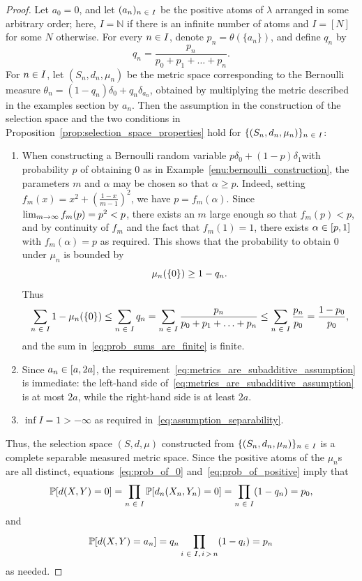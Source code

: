 \documentclass[AHL,Unicode]{cedram}
\newcommand*\n{\mathbb{N}}
\newcommand*\p{\mathbb{P}}
\let\originalleft\left
\let\originalright\right
\renewcommand{\left}{\mathopen{}\mathclose\bgroup\originalleft}
\renewcommand{\right}{\aftergroup\egroup\originalright}
\renewcommand*{\to}{\mathchoice{\longrightarrow}{\rightarrow}{\rightarrow}{\rightarrow}}
\let\oldin\in
\renewcommand{\in}{\mathchoice{\oldin}{\oldin}{\,\oldin\,}{\,\oldin\,}}
\begin{document}
\begin{proof}
Let $a_{0}=0$, and let $(a_{n})_{n\in I}$ be the positive atoms of $\lambda$ arranged in some arbitrary order; here, $I=\n$ if there is an infinite number of atoms and $I=[N]$ for some $N$ otherwise. For every $n\in I$, denote $p_{n}=\theta(\{ a_{n}\})$, and define $q_{n}$ by
\[
q_{n}=\frac{p_{n}}{p_{0}+p_{1}+\ldots+p_{n}}.
\]
For $n\in I$, let $(S_{n},d_{n},\mu_{n})$ be the metric space corresponding to the Bernoulli measure $\theta_{n}=(1-q_{n})\delta_{0}+q_{n}\delta_{a_{n}}$, obtained by multiplying the metric described in the examples section by $a_{n}$. Then the assumption in the construction of the selection space and the two conditions in Proposition~\ref{prop:selection_space_properties} hold for $\{ (S_{n},d_{n},\mu_{n})\} _{n\in I}$:
\begin{enumerate}
\item When constructing a Bernoulli random variable $p\delta_{0}+(1-p)\delta_{1}$with probability $p$ of obtaining $0$ as in Example~\ref{enu:bernoulli_construction}, the parameters $m$ and $\alpha$ may be chosen so that $\alpha\geq p$. Indeed, setting $f_{m}(x)=x^{2}+(\frac{1-x}{m-1})^{2}$, we have $p=f_{m}(\alpha)$. Since $\lim_{m\to\infty}f_{m}(p)=p^{2}<p$, there exists an $m$ large enough so that $f_{m}(p)<p$, and by continuity of $f_{m}$ and the fact that $f_{m}(1)=1$, there exists $\alpha\in[p,1]$ with $f_{m}(\alpha)=p$ as required. This shows that the probability to obtain $0$ under $\mu_{n}$ is bounded by
\begin{equation}\label{eq:bound_on_q}
\mu_{n}\left(\left\{ 0\right\} \right)\geq1-q_{n}.
\end{equation}
Thus
\begin{equation}\label{eq:sum_of_q_is_finite}
\sum_{n\in I}1-\mu_{n}\left(\left\{ 0\right\} \right)\leq\sum_{n\in I}q_{n}=\sum_{n\in I}\frac{p_{n}}{p_{0}+p_{1}+\ldots+p_{n}}\leq\sum_{n\in I}\frac{p_{n}}{p_{0}}=\frac{1-p_{0}}{p_{0}},
\end{equation}
and the sum in~\eqref{eq:prob_sums_are_finite} is finite.
\item Since $a_{n}\in[a,2a]$, the requirement~\eqref{eq:metrics_are_subadditive_assumption} is immediate: the left-hand side of~\eqref{eq:metrics_are_subadditive_assumption} is at most $2a$, while the right-hand side is at least $2a$.
\item $\inf I=1>-\infty$ as required in~\eqref{eq:assumption_separability}.
\end{enumerate}
Thus, the selection space $(S,d,\mu)$ constructed from $\{(S_{n},d_{n},\mu_{n})\} _{n\in I}$ is a complete separable measured metric space. Since the positive atoms of the $\mu_{n}$s are all distinct, equations~\eqref{eq:prob_of_0} and~\eqref{eq:prob_of_positive} imply that
\begin{equation}\label{eq:single_prob_zero}
\p\left[d\left(X,Y\right)=0\right]=\prod_{n\in I}\p\left[d_{n}\left(X_{n},Y_{n}\right)=0\right]=\prod_{n\in I}\left(1-q_{n}\right)=p_{0},
\end{equation}
and
\[
\p\left[d\left(X,Y\right)=a_{n}\right]=q_{n}\prod_{i\in I,\,i\,>\,n}\left(1-q_{i}\right)=p_{n}
\]
as needed.


\end{proof}
\end{document}
